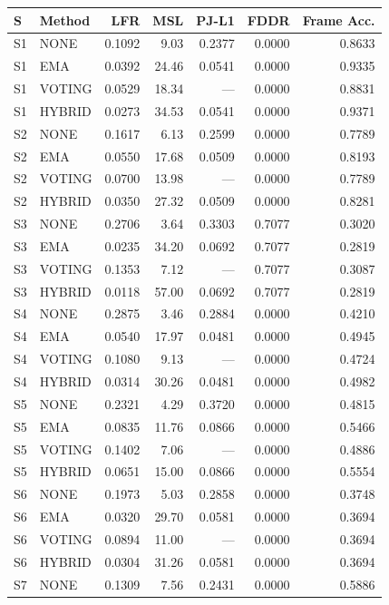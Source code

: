 \begin{tabular}{llrrrrr}
\toprule
\textbf{S} & \textbf{Method} & \textbf{LFR} & \textbf{MSL} & \textbf{PJ-L1} & \textbf{FDDR} & \textbf{Frame Acc.}\\
\midrule
S1 & NONE & 0.1092 & 9.03 & 0.2377 & 0.0000 & 0.8633\\
S1 & EMA & 0.0392 & 24.46 & 0.0541 & 0.0000 & 0.9335\\
S1 & VOTING & 0.0529 & 18.34 & --- & 0.0000 & 0.8831\\
S1 & HYBRID & 0.0273 & 34.53 & 0.0541 & 0.0000 & 0.9371\\
S2 & NONE & 0.1617 & 6.13 & 0.2599 & 0.0000 & 0.7789\\
S2 & EMA & 0.0550 & 17.68 & 0.0509 & 0.0000 & 0.8193\\
S2 & VOTING & 0.0700 & 13.98 & --- & 0.0000 & 0.7789\\
S2 & HYBRID & 0.0350 & 27.32 & 0.0509 & 0.0000 & 0.8281\\
S3 & NONE & 0.2706 & 3.64 & 0.3303 & 0.7077 & 0.3020\\
S3 & EMA & 0.0235 & 34.20 & 0.0692 & 0.7077 & 0.2819\\
S3 & VOTING & 0.1353 & 7.12 & --- & 0.7077 & 0.3087\\
S3 & HYBRID & 0.0118 & 57.00 & 0.0692 & 0.7077 & 0.2819\\
S4 & NONE & 0.2875 & 3.46 & 0.2884 & 0.0000 & 0.4210\\
S4 & EMA & 0.0540 & 17.97 & 0.0481 & 0.0000 & 0.4945\\
S4 & VOTING & 0.1080 & 9.13 & --- & 0.0000 & 0.4724\\
S4 & HYBRID & 0.0314 & 30.26 & 0.0481 & 0.0000 & 0.4982\\
S5 & NONE & 0.2321 & 4.29 & 0.3720 & 0.0000 & 0.4815\\
S5 & EMA & 0.0835 & 11.76 & 0.0866 & 0.0000 & 0.5466\\
S5 & VOTING & 0.1402 & 7.06 & --- & 0.0000 & 0.4886\\
S5 & HYBRID & 0.0651 & 15.00 & 0.0866 & 0.0000 & 0.5554\\
S6 & NONE & 0.1973 & 5.03 & 0.2858 & 0.0000 & 0.3748\\
S6 & EMA & 0.0320 & 29.70 & 0.0581 & 0.0000 & 0.3694\\
S6 & VOTING & 0.0894 & 11.00 & --- & 0.0000 & 0.3694\\
S6 & HYBRID & 0.0304 & 31.26 & 0.0581 & 0.0000 & 0.3694\\
S7 & NONE & 0.1309 & 7.56 & 0.2431 & 0.0000 & 0.5886\\

\end{tabular}
